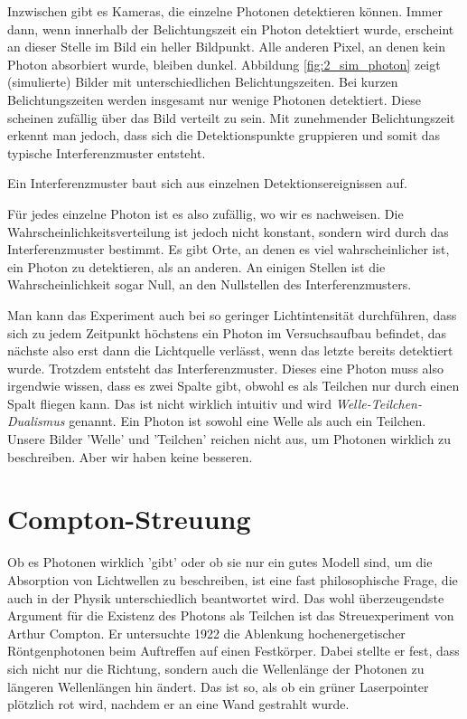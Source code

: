  Inzwischen gibt es Kameras, die einzelne Photonen detektieren können. Immer dann, wenn innerhalb der Belichtungszeit ein Photon detektiert wurde, erscheint an dieser Stelle im Bild ein heller Bildpunkt. Alle anderen Pixel, an denen kein Photon absorbiert wurde, bleiben dunkel. Abbildung  \ref{fig:2_sim_photon} zeigt (simulierte) Bilder mit unterschiedlichen Belichtungszeiten. Bei kurzen Belichtungszeiten werden insgesamt nur wenige Photonen detektiert. Diese scheinen zufällig über das Bild verteilt zu sein. Mit zunehmender Belichtungszeit erkennt man jedoch, dass sich die Detektionspunkte gruppieren und somit das typische Interferenzmuster entsteht.

\begin{marginfigure}
    \caption{Ein Interferenzmuster baut sich aus einzelnen Detektionsereignissen auf.}
    \label{fig:2_sim_photon}
\end{marginfigure}

 Für jedes einzelne Photon ist es also zufällig, wo wir es nachweisen. Die Wahrscheinlichkeitsverteilung ist jedoch nicht konstant, sondern wird durch das Interferenzmuster bestimmt. Es gibt Orte, an denen es viel wahrscheinlicher ist, ein Photon zu detektieren, als an anderen. An einigen Stellen ist die Wahrscheinlichkeit sogar Null, an den Nullstellen des Interferenzmusters.

 Man kann das Experiment auch bei so geringer Lichtintensität durchführen, dass sich zu jedem Zeitpunkt höchstens ein Photon im Versuchsaufbau befindet, das nächste also erst dann die Lichtquelle verlässt, wenn das letzte bereits detektiert wurde. Trotzdem entsteht das Interferenzmuster. Dieses eine Photon muss also irgendwie wissen, dass es zwei Spalte gibt, obwohl es als Teilchen nur durch einen Spalt fliegen kann. Das ist nicht wirklich intuitiv und wird \emph{Welle-Teilchen-Dualismus} genannt. Ein Photon ist sowohl eine Welle als auch ein Teilchen. Unsere Bilder 'Welle' und 'Teilchen' reichen nicht aus, um Photonen wirklich zu beschreiben. Aber wir haben keine besseren.



 \section{Compton-Streuung}

 Ob es Photonen wirklich 'gibt' oder ob sie nur ein gutes Modell sind, um die Absorption von Lichtwellen zu beschreiben, ist eine fast philosophische Frage, die auch in der Physik unterschiedlich beantwortet wird. Das wohl überzeugendste Argument für die Existenz des Photons als Teilchen ist das Streuexperiment von Arthur Compton. Er untersuchte 1922 die Ablenkung hochenergetischer Röntgenphotonen beim Auftreffen auf einen Festkörper. Dabei stellte er fest, dass sich nicht nur die Richtung, sondern auch die Wellenlänge der Photonen zu längeren Wellenlängen hin ändert. Das ist so, als ob ein grüner Laserpointer plötzlich rot wird, nachdem er an eine Wand gestrahlt wurde.

